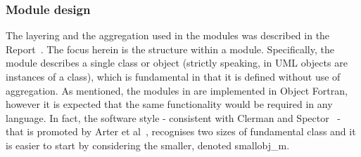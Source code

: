 \subsubsection{Module design}

The layering and the aggregation used in the  modules was described in the
Report~\cite[\S\,2.4]{y2re333}.
The focus herein is the structure within a module. Specifically, the module describes a single class or object
(strictly speaking, in UML objects are instances of a class), which is
fundamental in that it is defined without use of aggregation. As mentioned, the modules in  are
implemented in Object Fortran, however it is
expected that the same functionality would be required in any language. In fact, the software
style  - consistent with Clerman and Spector~\cite[\S\,11]{clermanspector} -
that is promoted by Arter et al~\cite{fprog}, recognises two sizes of fundamental class
and it is easier to start by considering the smaller, denoted smallobj\_m.

